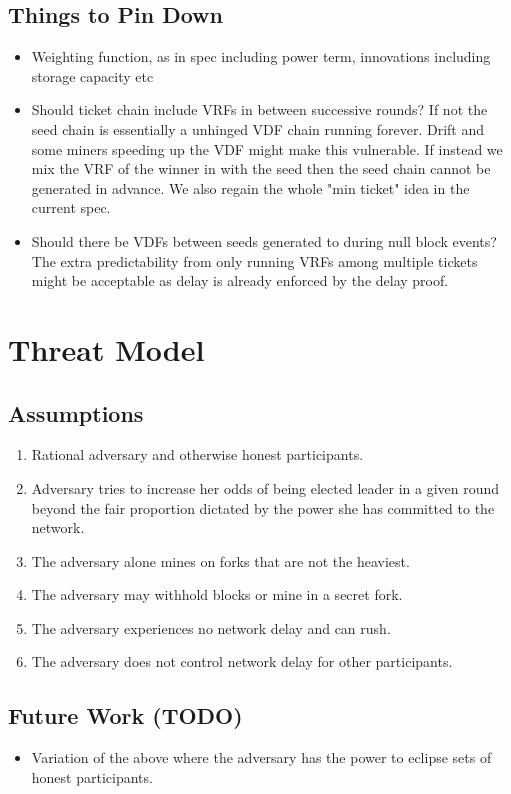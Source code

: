 \documentclass{article}
\begin{document}
\subsection{Things to Pin Down}
\begin{itemize}
    \item Weighting function, as in spec including power term, innovations including storage capacity etc
    \item Should ticket chain include VRFs in between successive rounds?  If not the seed chain is essentially a unhinged VDF chain running forever.  Drift and some miners speeding up the VDF might make this vulnerable.  If instead we mix the VRF of the winner in with the seed then the seed chain cannot be generated in advance.  We also regain the whole "min ticket" idea in the current spec.
    \item 
    Should there be VDFs between seeds generated to during null block events?  The extra predictability from only running VRFs among multiple tickets might be acceptable as delay is already enforced by the delay proof.
\end{itemize}

\section{Threat Model}

\subsection{Assumptions}
\begin{enumerate}
    \item Rational adversary and otherwise honest participants.
    \item Adversary tries to increase her odds of being elected leader in a given round beyond the fair proportion dictated by the power she has committed to the network.
    \item The adversary alone mines on forks that are not the heaviest.
    \item The adversary may withhold blocks or mine in a secret fork.
    \item The adversary experiences no network delay and can rush.
    \item The adversary does not control network delay for other participants.
\end{enumerate}

\subsection{Future Work (TODO)}
\begin{itemize}
\item Variation of the above where the adversary has the power to eclipse sets of honest participants.
\end{itemize}
    
\end{document}
